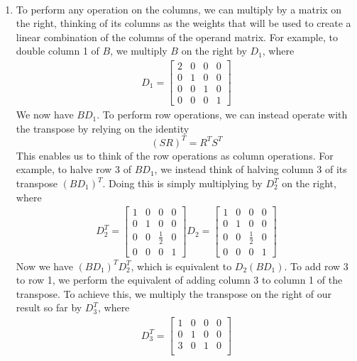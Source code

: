\documentclass[12pt]{article}
\newenvironment{sol}[1][Solution]{\begin{trivlist}
		\item[\hskip \labelsep {\bfseries #1:}]}{\end{trivlist}}
\begin{document}
\begin{sol}
	\
	\begin{enumerate}[label=(\alph*)]
		\item To perform any operation on the columns, we can multiply by a matrix on the right,
		thinking of its columns as the weights that will be used to create a linear combination
		of the columns of the operand matrix. For example, to double column 1 of $B$, we multiply
		$B$ on the right by $D_1$, where
		\begin{align*}
			D_1=\begin{bmatrix}
				2 & 0 & 0 & 0\\
				0 & 1 & 0 & 0\\
				0 & 0 & 1 & 0\\
				0 & 0 & 0 & 1
			\end{bmatrix}
		\end{align*}
		We now have $BD_1$. To perform row operations, we can instead operate with the transpose
		by relying on the identity
		\[
			(SR)^T=R^TS^T
		\]
		This enables us to think of the row operations as column operations. For example, to
		halve row 3 of $BD_1$, we instead think of halving column 3 of its transpose $(BD_1)^T$.
		Doing this is simply multiplying by $D_2^T$ on the right, where
		\begin{align*}
			D_2^T=\begin{bmatrix}
				1 & 0 & 0 & 0\\
				0 & 1 & 0 & 0\\
				0 & 0 & \frac{1}{2} & 0\\
				0 & 0 & 0 & 1
			\end{bmatrix}
			D_2=\begin{bmatrix}
				1 & 0 & 0 & 0\\
				0 & 1 & 0 & 0\\
				0 & 0 & \frac{1}{2} & 0\\
				0 & 0 & 0 & 1
			\end{bmatrix}
		\end{align*}
		Now we have $(BD_1)^TD_2^T$, which is equivalent to $D_2(BD_1)$. To add row 3 to row 1,
		we perform the equivalent of adding column 3 to column 1 of the transpose. To achieve this,
		we multiply the transpose on the right of our result so far by
		$D_3^T$, where
		\begin{align*}
			D_3^T = \begin{bmatrix}
				1 & 0 & 0 & 0\\
				0 & 1 & 0 & 0\\
				3 & 0 & 1 & 0\\

\end{bmatrix}
\end{align*}
\end{enumerate}
\end{sol}
\end{document}
